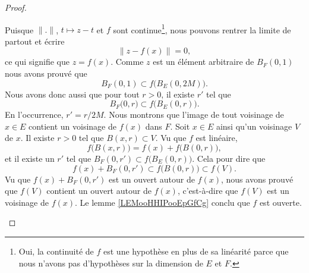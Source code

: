 \begin{proof}
\begin{subproof}
		Puisque \( \| . \|\), \( t\mapsto z-t\) et \( f\) sont continue\footnote{Oui, la continuité de \( f\) est une hypothèse en plus de sa linéarité parce que nous n'avons pas d'hypothèses sur la dimension de \( E\) et \( F\).}, nous pouvons rentrer la limite de partout et écrire
		\begin{equation}
			\| z-f(x) \|=0,
		\end{equation}
		ce qui signifie que \( z=f(x)\). Comme \( z\) est un élément arbitraire de \( B_F(0,1)\) nous avons prouvé que
		\begin{equation}
			B_F(0,1)\subset f\big( B_E(0,2M) \big).
		\end{equation}
		Nous avons donc aussi que pour tout \( r>0\), il existe \( r'\) tel que
		\begin{equation}
			B_F\big( 0, r \big)\subset f\big( B_E(0,r) \big).
		\end{equation}
		En l'occurrence, \( r'=r/2M\).
		Nous montrons que l'image de tout voisinage de \( x\in E\) contient un voisinage de \( f(x)\) dans \( F\). Soit \( x\in E\) ainsi qu'un voisinage \( V\) de \( x\). Il existe \( r>0\) tel que \( B(x,r)\subset V\). Vu que \( f\) est linéaire,
		\begin{equation}
			f\big( B(x,r) \big)=f(x)+f\big( B(0,r) \big),
		\end{equation}
		et il existe un \( r'\) tel que \( B_F(0,r')\subset f\big( B_E(0,r) \big)\). Cela pour dire que
		\begin{equation}
			f(x)+B_F(0,r')\subset f\big( B(0,r) \big)\subset f(V).
		\end{equation}
		Vu que \( f(x)+B_F(0,r')\) est un ouvert autour de \( f(x)\), nous avons prouvé que \( f(V)\) contient un ouvert autour de \( f(x)\), c'est-à-dire que \( f(V)\) est un voisinage de \( f(x)\).
		\spitem[Conclusion]
		Le lemme \ref{LEMooHHIPooEpGfCg} conclu que \( f\) est ouverte.
	\end{subproof}

\end{proof}
